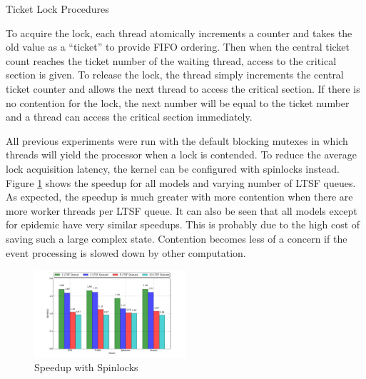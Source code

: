 \documentclass[11pt]{book}
\begin{document}
\begin{algorithm}
\DontPrintSemicolon
{}

    \;


    \caption{Ticket Lock Procedures\cite{wiki:ticketlock-15}}\label{ticket_lock}
\end{algorithm}

To acquire the lock, each thread atomically increments a counter and takes the old value as a
``ticket'' to provide FIFO ordering.  Then when the central ticket count reaches the ticket number
of the waiting thread, access to the critical section is given.  To release the lock, the thread
simply increments the central ticket counter and allows the next thread to access the critical
section.  If there is no contention for the lock, the next number will be equal to the ticket number
and a thread can access the critical section immediately.

All previous experiments were run with the default blocking mutexes in which threads will yield the
processor when a lock is contended.  To reduce the average lock acquisition latency, the kernel can
be configured with spinlocks instead.  Figure \ref{spinlock_speedup} shows the speedup for all
models and varying number of LTSF queues.  As expected, the speedup is much greater with more
contention when there are more worker threads per LTSF queue.  It can also be seen that all models
except for epidemic have very similar speedups.  This is probably due to the high cost of saving
such a large complex state.  Contention becomes less of a concern if the event processing is slowed
down by other computation.

\begin{figure}
\centering
  \includegraphics[width=0.5\textwidth,quiet]{figs/pending_event_set/spinlock_speedup.pdf}
  \caption{Speedup with Spinlocks}\label{spinlock_speedup}
\end{figure}
\end{document}
